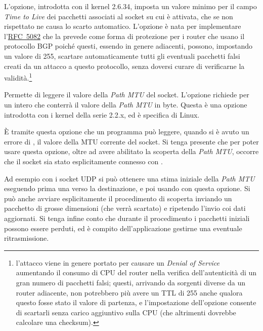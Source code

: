 \begin{basedescript}{\desclabelwidth{2.0cm}\desclabelstyle{\nextlinelabel}}
\item[\constd{IP\_MINTTL}] L'opzione, introdotta con il kernel 2.6.34, imposta
  un valore minimo per il campo \textit{Time to Live} dei pacchetti associati
  al socket su cui è attivata, che se non rispettato ne causa lo scarto
  automatico. L'opzione è nata per implementare
  l'\href{http://www.ietf.org/rfc/rfc5082.txt}{RFC~5082} che la prevede come
  forma di protezione per i router che usano il protocollo BGP poiché questi,
  essendo in genere adiacenti, possono, impostando un valore di 255, scartare
  automaticamente tutti gli eventuali pacchetti falsi creati da un attacco a
  questo protocollo, senza doversi curare di verificarne la
  validità.\footnote{l'attacco viene in genere portato per causare un
    \textit{Denial of Service} aumentando il consumo di CPU del router nella
    verifica dell'autenticità di un gran numero di pacchetti falsi; questi,
    arrivando da sorgenti diverse da un router adiacente, non potrebbero più
    avere un TTL di 255 anche qualora questo fosse stato il valore di
    partenza, e l'impostazione dell'opzione consente di scartarli senza carico
    aggiuntivo sulla CPU (che altrimenti dovrebbe calcolare una checksum).}

\item[\constd{IP\_MTU}] Permette di leggere il valore della \textit{Path MTU}
  del socket.  L'opzione richiede per  un intero che conterrà il
  valore della \textit{Path MTU} in byte.  Questa è una opzione introdotta con
  i kernel della serie 2.2.x, ed è specifica di Linux.

  È tramite questa opzione che un programma può leggere, quando si è avuto un
  errore di , il valore della MTU corrente del socket. Si
  tenga presente che per poter usare questa opzione, oltre ad avere abilitato
  la scoperta della \textit{Path MTU}, occorre che il socket sia stato
  esplicitamente connesso con . 

  Ad esempio con i socket UDP si può ottenere una stima iniziale della
  \textit{Path MTU} eseguendo prima una  verso la destinazione,
  e poi usando  con questa opzione. Si può anche avviare
  esplicitamente il procedimento di scoperta inviando un pacchetto di grosse
  dimensioni (che verrà scartato) e ripetendo l'invio coi dati aggiornati. Si
  tenga infine conto che durante il procedimento i pacchetti iniziali possono
  essere perduti, ed è compito dell'applicazione gestirne una eventuale
  ritrasmissione.


\end{basedescript}
